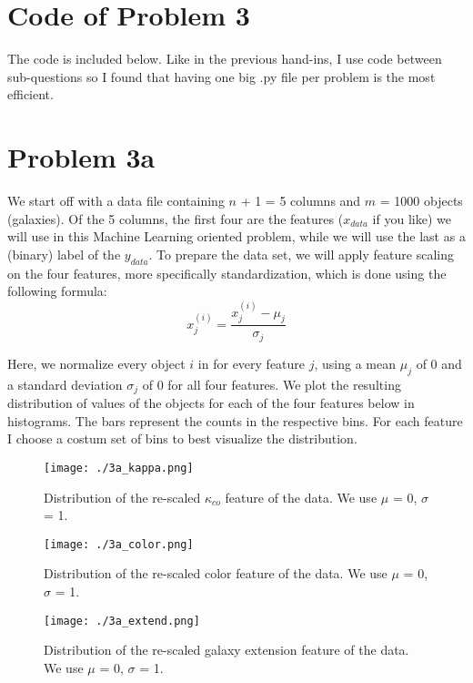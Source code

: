 \section*{Code of Problem 3}

The code is included below. Like in the previous hand-ins, I use code between sub-questions so I found that having one big .py file per problem is the most efficient.


\newpage

\section*{Problem 3a}

We start off with a data file containing $n$ + 1 = 5 columns and $m$ = 1000 objects (galaxies). Of the 5 columns, the first four are the features ($x_{data}$ if you like) we will use in this Machine Learning oriented problem, while we will use the last as a (binary) label of the $y_{data}$. To prepare the data set, we will apply feature scaling on the four features, more specifically standardization, which is done using the following formula:\\

\begin{equation}
x_j^{(i)} = \frac{x_j^{(i)} - \mu_j}{\sigma_j}
\end{equation}

Here, we normalize every object $i$ in for every feature $j$, using a mean $\mu_j$ of 0 and a standard deviation $\sigma_j$ of 0 for all four features. We plot the resulting distribution of values of the objects for each of the four features below in histograms. The bars represent the counts in the respective bins. For each feature I choose a costum set of bins to best visualize the distribution.

\begin{figure}[h!]
  \centering
  \texttt{[image: ./3a\_kappa.png]}
  \caption{Distribution of the re-scaled $\kappa_{co}$ feature of the data. We use $\mu$ = 0, $\sigma$ = 1.}
\end{figure}

\begin{figure}[h!]
  \centering
  \texttt{[image: ./3a\_color.png]}
  \caption{Distribution of the re-scaled color feature of the data. We use $\mu$ = 0, $\sigma$ = 1.}
\end{figure}

\begin{figure}[h!]
  \centering
  \texttt{[image: ./3a\_extend.png]}
  \caption{Distribution of the re-scaled galaxy extension feature of the data. We use $\mu$ = 0, $\sigma$ = 1.}
\end{figure}

